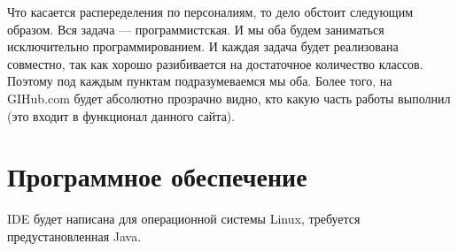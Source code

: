 \documentclass[12pt]{article}
\begin{document}
Что касается распеределения по персоналиям, то дело обстоит следующим образом. Вся задача --- программистская. И мы оба будем заниматься исключительно программированием. И каждая задача будет реализована совместно, так как хорошо разибивается на достаточное количество классов. Поэтому под каждым пунктам подразумеваемся мы оба. Более того, на GIHub.com будет абсолютно прозрачно видно, кто какую часть работы выполнил (это входит в функционал данного сайта).

\section{Программное обеспечение}
IDE будет написана для операционной системы Linux, требуется предустановленная Java. 
\end{document}
